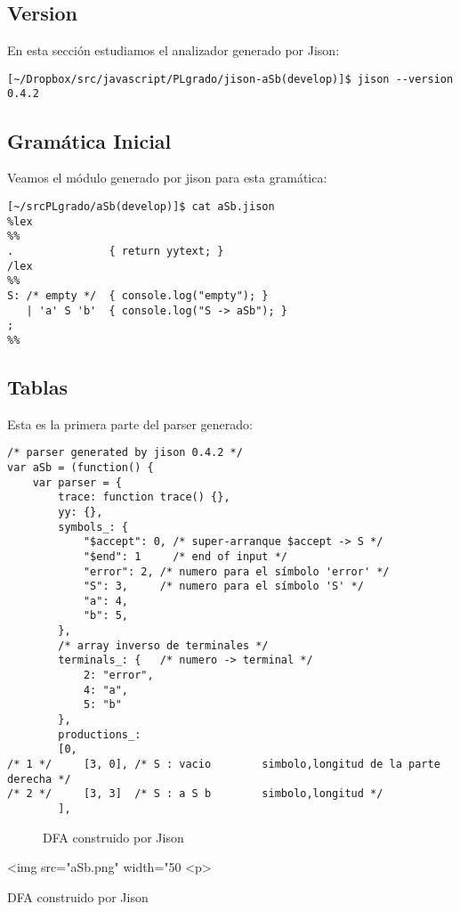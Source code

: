 \subsection{Version}

En esta sección estudiamos el analizador generado por Jison:
\begin{verbatim}
[~/Dropbox/src/javascript/PLgrado/jison-aSb(develop)]$ jison --version
0.4.2
\end{verbatim}

\subsection{Gramática Inicial}
Veamos el módulo generado por jison para esta gramática:
\begin{verbatim}
[~/srcPLgrado/aSb(develop)]$ cat aSb.jison 
%lex
%%
.               { return yytext; }
/lex
%%
S: /* empty */  { console.log("empty"); }
   | 'a' S 'b'  { console.log("S -> aSb"); }
;
%%
\end{verbatim}

\subsection{Tablas}
Esta es la primera parte del parser generado:
\begin{verbatim}
/* parser generated by jison 0.4.2 */
var aSb = (function() {
    var parser = {
        trace: function trace() {},
        yy: {},
        symbols_: {
            "$accept": 0, /* super-arranque $accept -> S */
            "$end": 1     /* end of input */
            "error": 2, /* numero para el símbolo 'error' */
            "S": 3,     /* numero para el símbolo 'S' */
            "a": 4,
            "b": 5,
        },
        /* array inverso de terminales */
        terminals_: {   /* numero -> terminal */
            2: "error", 
            4: "a",
            5: "b"
        },
        productions_: 
        [0, 
/* 1 */     [3, 0], /* S : vacio        simbolo,longitud de la parte derecha */
/* 2 */     [3, 3]  /* S : a S b        simbolo,longitud */
        ],
\end{verbatim}

\begin{center}
\begin{latexonly}
\begin{figure}[htb]
\centerline{}
\caption{DFA construido por Jison}
\label{fig:dfa}
\end{figure}
\end{latexonly}
\begin{rawhtml}
<img src="aSb.png" width="50%
<p>

DFA construido por Jison
\end{rawhtml}
\end{center}

